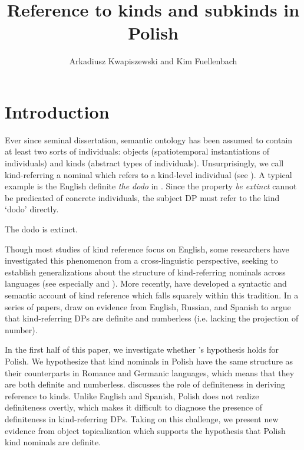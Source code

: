 \documentclass[output=paper,
colorlinks,
citecolor=brown,
newtxmath
]{langscibook}
\author{Arkadiusz Kwapiszewski\orcid{0000-0002-2957-0862}\affiliation{University of Oxford} and Kim Fuellenbach\orcid{0000-0003-4836-1617}\affiliation{University of Oxford}}
\title{Reference to kinds and subkinds in Polish}
\begin{document}
\maketitle


\section{Introduction}

Ever since  seminal dissertation, semantic ontology has been assumed to contain at least two sorts of individuals: objects (spatiotemporal instantiations of individuals) and kinds (abstract types of individuals). Unsurprisingly, we call kind-referring a nominal which refers to a kind-level individual (see \citealt{Krifka1995}). A typical example is the English definite \textit{the dodo} in . Since the property \textit{be extinct} cannot be predicated of concrete individuals, the subject DP must refer to the kind `dodo' directly.

\ea The dodo is extinct. \label{ex:dodo}
\z

\noindent
Though most studies of kind reference focus on English, some researchers have investigated this phenomenon from a cross-linguistic perspective, seeking to establish generalizations about the structure of kind-referring nominals across languages (see especially \citealt{Chierchia1998} and \citealt{Dayal2004}). More recently, \citeauthor{Borik.Espinal2012} have developed a syntactic and semantic account of kind reference which falls squarely within this tradition. In a series of papers, \cite{Borik.Espinal2012, Borik.Espinal2015, Borik.Espinal2016, Borik.Espinal2018} draw on evidence from English, Russian, and Spanish to argue that kind-referring DPs are definite and numberless (i.e. lacking the projection of number).

In the first half of this paper, we investigate whether \citeauthor{Borik.Espinal2012}'s hypothesis holds for Polish. We hypothesize that kind nominals in Polish have the same structure as their counterparts in Romance and Germanic languages, which means that they are both definite and numberless.  discusses the role of definiteness in deriving reference to kinds. Unlike English and Spanish, Polish does not realize definiteness overtly, which makes it difficult to diagnose the presence of definiteness in kind-referring DPs. Taking on this challenge, we present new evidence from object topicalization which supports the hypothesis that Polish kind nominals are definite.
\end{document}
